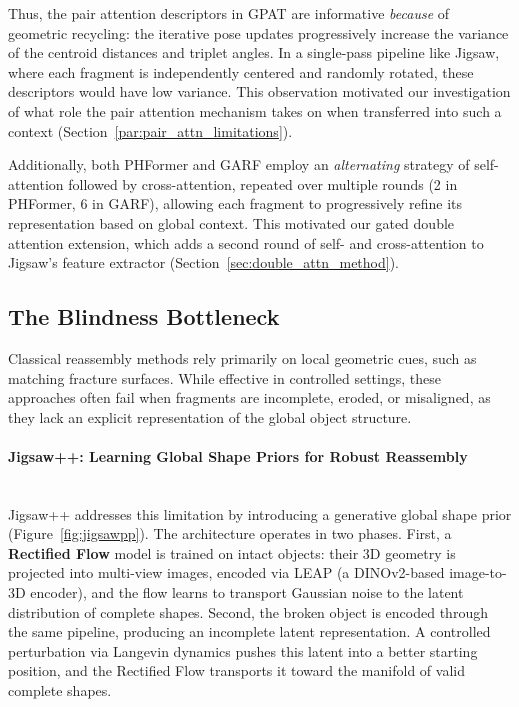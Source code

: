 Thus, the pair attention descriptors in GPAT are informative \textit{because} of geometric recycling: the iterative pose updates progressively increase the variance of the centroid distances and triplet angles. In a single-pass pipeline like Jigsaw, where each fragment is independently centered and randomly rotated, these descriptors would have low variance. This observation motivated our investigation of what role the pair attention mechanism takes on when transferred into such a context (Section~\ref{par:pair_attn_limitations}).

Additionally, both PHFormer and GARF employ an \textit{alternating} strategy of self-attention followed by cross-attention, repeated over multiple rounds (2 in PHFormer, 6 in GARF), allowing each fragment to progressively refine its representation based on global context. This motivated our gated double attention extension, which adds a second round of self- and cross-attention to Jigsaw's feature extractor (Section~\ref{sec:double_attn_method}).

\subsection{The Blindness Bottleneck}

Classical reassembly methods rely primarily on local geometric cues, such as matching fracture surfaces. While effective in controlled settings, these approaches often fail when fragments are incomplete, eroded, or misaligned, as they lack an explicit representation of the global object structure.

\paragraph{Jigsaw++: Learning Global Shape Priors for Robust Reassembly} \mbox{} \\
Jigsaw++ \cite{lu2024jigsawpp} addresses this limitation by introducing a generative global shape prior (Figure~\ref{fig:jigsawpp}). The architecture operates in two phases. First, a \textbf{Rectified Flow} model is trained on intact objects: their 3D geometry is projected into multi-view images, encoded via LEAP \cite{jiang2024leap} (a DINOv2-based image-to-3D encoder), and the flow learns to transport Gaussian noise to the latent distribution of complete shapes. Second, the broken object is encoded through the same pipeline, producing an incomplete latent representation. A controlled perturbation via Langevin dynamics pushes this latent into a better starting position, and the Rectified Flow transports it toward the manifold of valid complete shapes.


